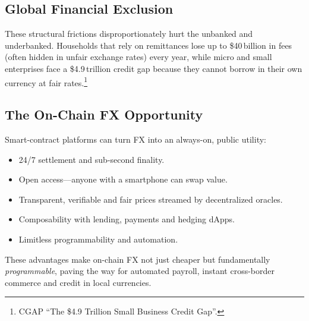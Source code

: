 \documentclass[a4paper]{article}
\providecommand{\hyp}{-}
\theoremstyle{definition}
\begin{document}
\subsection{Global Financial Exclusion}
These structural frictions disproportionately hurt the unbanked and underbanked.  Households that rely on remittances lose up to \$40\,billion in fees (often hidden in unfair exchange rates) every year\cite{worldbank_remittance_2023}, while micro and small enterprises face a \$4.9\,trillion credit gap because they cannot borrow in their own currency at fair rates.\footnote{CGAP ``The \$4.9 Trillion Small Business Credit Gap''.}

\subsection{The On\hyp Chain FX Opportunity}
Smart\hyp contract platforms can turn FX into an always\hyp on, public utility:
\begin{itemize}[leftmargin=*]
  \item 24/7 settlement and sub-second finality.
  \item Open access––anyone with a smartphone can swap value.
  \item Transparent, verifiable and fair prices streamed by decentralized oracles.
  \item Composability with lending, payments and hedging dApps.
  \item Limitless programmability and automation.
\end{itemize}
These advantages make on\hyp chain FX not just cheaper but fundamentally \emph{programmable}, paving the way for automated payroll, instant cross\hyp border commerce and credit in local currencies.
\end{document}
